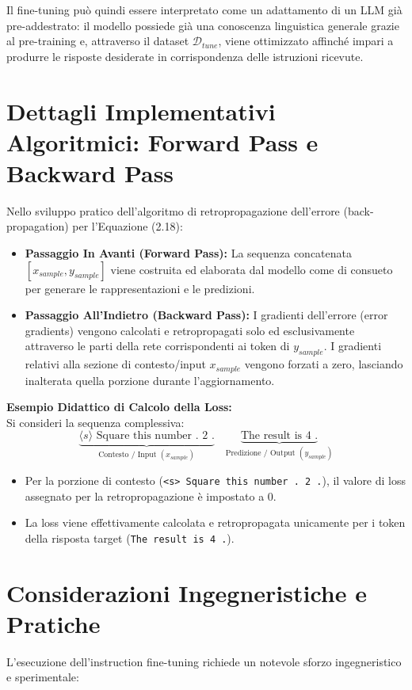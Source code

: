 Il fine-tuning può quindi essere interpretato come un adattamento di un
LLM già pre-addestrato: il modello possiede già una conoscenza
linguistica generale grazie al pre-training e, attraverso il dataset
$\mathcal{D}_{tune}$, viene ottimizzato affinché impari a produrre le
risposte desiderate in corrispondenza delle istruzioni ricevute.


\section*{Dettagli Implementativi Algoritmici: Forward Pass e Backward Pass}
Nello sviluppo pratico dell'algoritmo di retropropagazione dell'errore (back-propagation) per l'Equazione (2.18):

\begin{itemize}
    \item \textbf{Passaggio In Avanti (Forward Pass):} La sequenza concatenata $[x_{sample}, y_{sample}]$ viene costruita ed elaborata dal modello come di consueto per generare le rappresentazioni e le predizioni.
    \item \textbf{Passaggio All'Indietro (Backward Pass):} I gradienti dell'errore (error gradients) vengono calcolati e retropropagati solo ed esclusivamente attraverso le parti della rete corrispondenti ai token di $y_{sample}$. I gradienti relativi alla sezione di contesto/input $x_{sample}$ vengono forzati a zero, lasciando inalterata quella porzione durante l'aggiornamento.
\end{itemize}

\textbf{Esempio Didattico di Calcolo della Loss:} \\
Si consideri la sequenza complessiva:
\[
\underbrace{\langle s \rangle \text{ Square this number . 2 .}}_{\text{Contesto / Input } (x_{sample})} \quad \underbrace{\text{The result is 4 .}}_{\text{Predizione / Output } (y_{sample})}
\]

\begin{itemize}
    \item Per la porzione di contesto (\texttt{<s> Square this number . 2 .}), il valore di loss assegnato per la retropropagazione è impostato a 0.
    \item La loss viene effettivamente calcolata e retropropagata unicamente per i token della risposta target (\texttt{The result is 4 .}).
\end{itemize}

\section*{Considerazioni Ingegneristiche e Pratiche}
L'esecuzione dell'instruction fine-tuning richiede un notevole sforzo ingegneristico e sperimentale:

